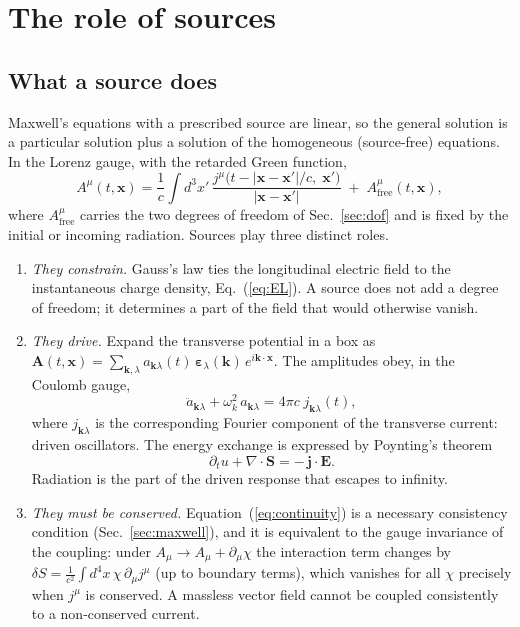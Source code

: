 \documentclass[11pt,a4paper]{book}
\begin{document}
\section{The role of sources}
\label{sec:sources}

\subsection{What a source does}

Maxwell's equations with a prescribed source are linear, so the general solution is a particular
solution plus a solution of the homogeneous (source-free) equations. In the Lorenz gauge, with the
retarded Green function,
\begin{equation}
A^\mu(t,\mathbf x)=\frac1c\int d^3x'\,
\frac{j^\mu\bigl(t-|\mathbf x-\mathbf x'|/c,\;\mathbf x'\bigr)}{|\mathbf x-\mathbf x'|}
\;+\;A^\mu_{\text{free}}(t,\mathbf x),
\label{eq:retarded}
\end{equation}
where $A^\mu_{\text{free}}$ carries the two degrees of freedom of Sec.~\ref{sec:dof} and
is fixed by the initial or incoming radiation. Sources play three distinct roles.

\begin{enumerate}
\item \emph{They constrain.} Gauss's law ties the longitudinal electric field to the instantaneous
charge density, Eq.~(\ref{eq:EL}). A source does not add a degree of freedom; it determines a part
of the field that would otherwise vanish.
\item \emph{They drive.} Expand the transverse potential in a box as
$\mathbf A(t,\mathbf x)=\sum_{\mathbf k,\lambda}a_{\mathbf k\lambda}(t)\,\boldsymbol\varepsilon_\lambda(\mathbf k)\,e^{i\mathbf k\cdot\mathbf x}$.
The amplitudes obey, in the Coulomb gauge,
\begin{equation}
\ddot a_{\mathbf k\lambda}+\omega_k^2\,a_{\mathbf k\lambda}=4\pi c\;j_{\mathbf k\lambda}(t),
\end{equation}
where $j_{\mathbf k\lambda}$ is the corresponding Fourier component of the transverse current:
driven oscillators. The energy exchange is expressed by Poynting's theorem
\begin{equation}
\partial_t u+\nabla\cdot\mathbf S=-\,\mathbf j\cdot\mathbf E .
\end{equation}
Radiation is the part of the driven response that escapes to infinity.
\item \emph{They must be conserved.} Equation~(\ref{eq:continuity}) is a necessary consistency
condition (Sec.~\ref{sec:maxwell}), and it is equivalent to the gauge invariance of the coupling:
under $A_\mu\to A_\mu+\partial_\mu\chi$ the interaction term changes by
$\delta S=\frac1{c^2}\int d^4x\,\chi\,\partial_\mu j^\mu$ (up to boundary terms), which vanishes
for all $\chi$ precisely when $j^\mu$ is conserved. A massless vector field cannot be coupled
consistently to a non-conserved current.
\end{enumerate}
\end{document}
